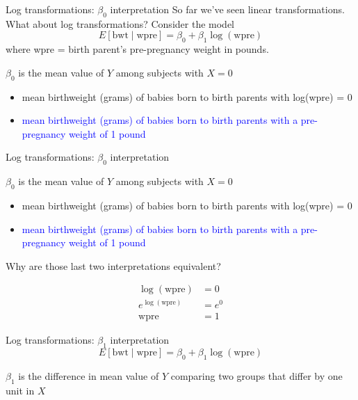 \documentclass[10pt,t]{beamer}
\begin{document}
\begin{frame}{Log transformations: $\beta_0$ interpretation}
So far we've seen linear transformations. What about log transformations? Consider the model
$$
E[\text{bwt} \mid \text{wpre}] = \beta_0 + \beta_1 \log(\text{wpre})
$$
where wpre = birth parent's pre-pregnancy weight in pounds.

\vspace{0.3cm}

$\beta_0$ is the mean value of $Y$ among subjects with $X = 0$

\begin{itemize}
	\item[] mean birthweight (grams) of babies born to birth parents with log(wpre) = 0
	\item[] \textcolor{blue}{mean birthweight (grams) of babies born to birth parents with a pre-pregnancy weight of 1 pound}
\end{itemize}

\end{frame}

\begin{frame}{Log transformations: $\beta_0$ interpretation}

$\beta_0$ is the mean value of $Y$ among subjects with $X = 0$

\begin{itemize}
	\item[] mean birthweight (grams) of babies born to birth parents with log(wpre) = 0
	\item[] \textcolor{blue}{mean birthweight (grams) of babies born to birth parents with a pre-pregnancy weight of 1 pound}
\end{itemize}

\vspace{0.3cm}


Why are those last two interpretations equivalent?


\begin{align*}
\log(\text{wpre}) & = 0 \\
e^{\log(\text{wpre})} & = e^0 \\
\text{wpre} & = 1
\end{align*}

\end{frame}

\begin{frame}{Log transformations: $\beta_1$ interpretation}
$$
E[\text{bwt} \mid \text{wpre}] = \beta_0 + \beta_1 \log(\text{wpre})
$$

\vspace{0.3cm}

$\beta_1$ is the difference in mean value of $Y$ comparing two groups that differ by one unit in $X$


\end{frame}
\end{document}
